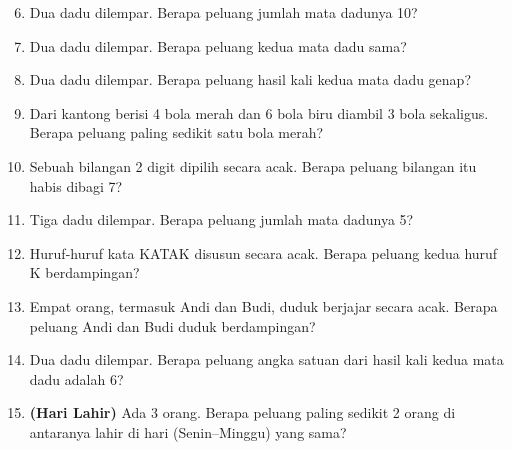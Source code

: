 \documentclass[11pt,a4paper]{article}
\begin{document}
\begin{enumerate}
  \setcounter{enumi}{5}
  \item Dua dadu dilempar. Berapa peluang jumlah mata dadunya 10?
  \item Dua dadu dilempar. Berapa peluang kedua mata dadu sama?
  \item Dua dadu dilempar. Berapa peluang hasil kali kedua mata dadu genap?
  \item Dari kantong berisi 4 bola merah dan 6 bola biru diambil 3 bola sekaligus. Berapa peluang
        paling sedikit satu bola merah?
  \item Sebuah bilangan 2 digit dipilih secara acak. Berapa peluang bilangan itu habis dibagi 7?
\end{enumerate}

\begin{enumerate}
  \setcounter{enumi}{10}
  \item Tiga dadu dilempar. Berapa peluang jumlah mata dadunya 5?
  \item Huruf-huruf kata KATAK disusun secara acak. Berapa peluang kedua huruf K berdampingan?
  \item Empat orang, termasuk Andi dan Budi, duduk berjajar secara acak. Berapa peluang Andi dan
        Budi duduk berdampingan?
  \item Dua dadu dilempar. Berapa peluang angka satuan dari hasil kali kedua mata dadu adalah 6?
  \item \textbf{(Hari Lahir)} Ada 3 orang. Berapa peluang paling sedikit 2 orang di antaranya lahir
        di hari (Senin--Minggu) yang sama?
\end{enumerate}
\end{document}
